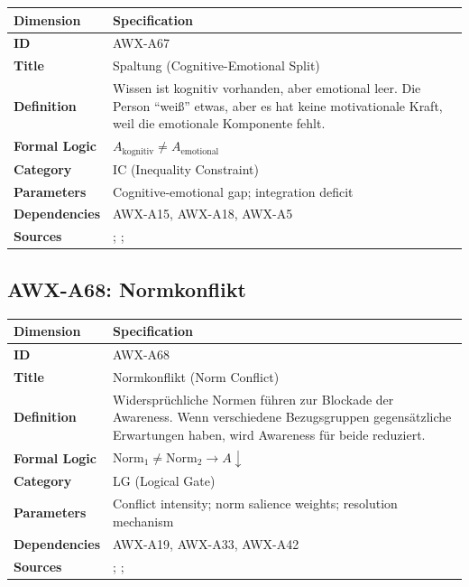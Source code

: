 \begin{table}[htbp]
\small
\begin{tabular}{p{3cm}p{11cm}}
\toprule
\textbf{Dimension} & \textbf{Specification} \\
\midrule
\textbf{ID} & AWX-A67 \\
\textbf{Title} & Spaltung (Cognitive-Emotional Split) \\
\textbf{Definition} & Wissen ist kognitiv vorhanden, aber emotional leer. Die Person ``weiß'' etwas, aber es hat keine motivationale Kraft, weil die emotionale Komponente fehlt. \\
\textbf{Formal Logic} & $A_{\text{kognitiv}} \neq A_{\text{emotional}}$ \\
\textbf{Category} & IC (Inequality Constraint) \\
\textbf{Parameters} & Cognitive-emotional gap; integration deficit \\
\textbf{Dependencies} & AWX-A15, AWX-A18, AWX-A5 \\
\textbf{Sources} & \citet{damasio1994descartes}; \citet{loewenstein2001risk}; \citet{slovic2004risk} \\
\bottomrule
\end{tabular}
\end{table}


\subsection{AWX-A68: Normkonflikt}

\begin{table}[htbp]
\small
\begin{tabular}{p{3cm}p{11cm}}
\toprule
\textbf{Dimension} & \textbf{Specification} \\
\midrule
\textbf{ID} & AWX-A68 \\
\textbf{Title} & Normkonflikt (Norm Conflict) \\
\textbf{Definition} & Widersprüchliche Normen führen zur Blockade der Awareness. Wenn verschiedene Bezugsgruppen gegensätzliche Erwartungen haben, wird Awareness für beide reduziert. \\
\textbf{Formal Logic} & $\text{Norm}_1 \neq \text{Norm}_2 \rightarrow A \downarrow$ \\
\textbf{Category} & LG (Logical Gate) \\
\textbf{Parameters} & Conflict intensity; norm salience weights; resolution mechanism \\
\textbf{Dependencies} & AWX-A19, AWX-A33, AWX-A42 \\
\textbf{Sources} & \citet{cialdini2004social}; \citet{bicchieri2005grammar}; \citet{akerlof2000identity} \\
\bottomrule
\end{tabular}
\end{table}

